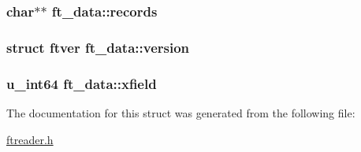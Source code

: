 \hypertarget{structft__data_a2135250dffa8caedbb2bd265ec4a9858}{
\subsubsection[{records}]{\setlength{\rightskip}{0pt plus 5cm}char$\ast$$\ast$ {\bf ft\-\_\-data\-::records}}}\label{structft__data_a2135250dffa8caedbb2bd265ec4a9858}
\hypertarget{structft__data_a936fc0f3ebdc017c5c8ea9a736f4fd37}{
\subsubsection[{version}]{\setlength{\rightskip}{0pt plus 5cm}struct ftver {\bf ft\-\_\-data\-::version}}}\label{structft__data_a936fc0f3ebdc017c5c8ea9a736f4fd37}
\hypertarget{structft__data_ae802fc1e0fb8ee6c2a313790f09501a7}{
\subsubsection[{xfield}]{\setlength{\rightskip}{0pt plus 5cm}u\-\_\-int64 {\bf ft\-\_\-data\-::xfield}}}\label{structft__data_ae802fc1e0fb8ee6c2a313790f09501a7}


\-The documentation for this struct was generated from the following file\-:\begin{DoxyCompactItemize}
\item 
\hyperlink{ftreader_8h}{ftreader.\-h}\end{DoxyCompactItemize}
